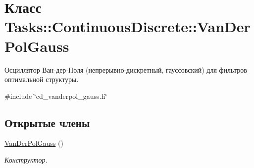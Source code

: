 \hypertarget{class_tasks_1_1_continuous_discrete_1_1_van_der_pol_gauss}{}\section{Класс Tasks\+:\+:Continuous\+Discrete\+:\+:Van\+Der\+Pol\+Gauss}
\label{class_tasks_1_1_continuous_discrete_1_1_van_der_pol_gauss}


Осциллятор Ван-\/дер-\/Поля (непрерывно-\/дискретный, гауссовский) для фильтров оптимальной структуры.  




{\ttfamily \#include \char`\"{}cd\+\_\+vanderpol\+\_\+gauss.\+h\char`\"{}}

\subsection*{Открытые члены}
\begin{DoxyCompactItemize}
\item 
\hyperlink{class_tasks_1_1_continuous_discrete_1_1_van_der_pol_gauss_aef78157117996a736918e7dcd9ebbdd5}{Van\+Der\+Pol\+Gauss} ()\hypertarget{class_tasks_1_1_continuous_discrete_1_1_van_der_pol_gauss_aef78157117996a736918e7dcd9ebbdd5}{}\label{class_tasks_1_1_continuous_discrete_1_1_van_der_pol_gauss_aef78157117996a736918e7dcd9ebbdd5}

\begin{DoxyCompactList}\small\item\em Конструктор. \end{DoxyCompactList}\end{DoxyCompactItemize}
